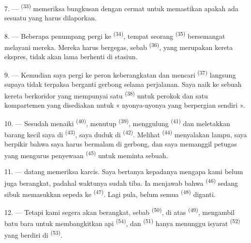 7. ---  \textsuperscript{(33)} memeriksa
bungkusan dengan cermat untuk memastikan apakah ada sesuatu yang harus
dilaporkan.

8. --- Beberapa penumpang pergi ke 
\textsuperscript{(34)}, tempat seorang 
\textsuperscript{(35)} bersemangat melayani mereka. Mereka harus
bergegas, sebab  \textsuperscript{(36)}, yang
merupakan kereta ekspres, tidak akan lama berhenti di stasiun.

9. --- Kemudian saya pergi ke peron keberangkatan dan mencari
 \textsuperscript{(37)} langsung supaya tidak terpaksa
berganti gerbong selama perjalanan. Saya naik ke sebuah kereta
berkoridor yang mempunyai satu 
\textsuperscript{(38)} untuk perokok dan satu kompartemen yang
disediakan untuk « nyonya-nyonya yang berpergian sendiri ».

\VUsaut{3.0mm}

10. --- Sesudah menaiki  \textsuperscript{(40)},
menutup  \textsuperscript{(39)}, menggulung 
\textsuperscript{(41)} dan meletakkan barang kecil saya di
 \textsuperscript{(43)}, saya duduk di
 \textsuperscript{(42)}. Melihat 
\textsuperscript{(44)} menyalakan lampu, saya berpikir bahwa saya harus
bermalam di gerbong, dan saya memanggil petugas yang mengurus
penyewaan  \textsuperscript{(45)} untuk meminta
sebuah.

11. ---  datang memeriksa karcis. Saya bertanya
kepadanya mengapa kami belum juga berangkat, padahal waktunya sudah
tiba. Ia menjawab bahwa  \textsuperscript{(46)}
sedang sibuk memasukkan sepeda ke 
\textsuperscript{(47)}. Lagi pula, belum semua 
\textsuperscript{(48)} diganti.

12. --- Tetapi kami segera akan berangkat, sebab 
\textsuperscript{(50)}, di atas 
\textsuperscript{(49)}, mengambil batu bara untuk membangkitkan api
 \textsuperscript{(54)}, dan 
\textsuperscript{(51)} hanya menunggu isyarat  \textsuperscript{(52)} yang berdiri di 
\textsuperscript{(53)}.

